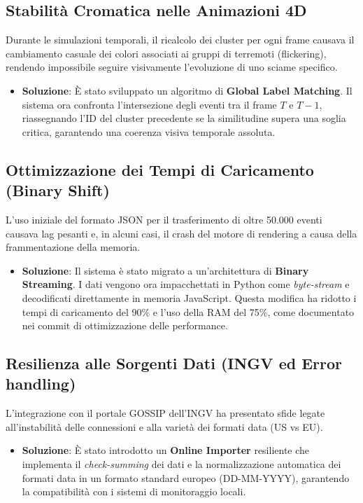 \documentclass[12pt,a4paper]{article}
\begin{document}
\subsection{Stabilità Cromatica nelle Animazioni 4D}
Durante le simulazioni temporali, il ricalcolo dei cluster per ogni frame causava il cambiamento casuale dei colori associati ai gruppi di terremoti (flickering), rendendo impossibile seguire visivamente l'evoluzione di uno sciame specifico.
\begin{itemize}
    \item \textbf{Soluzione}: È stato sviluppato un algoritmo di \textbf{Global Label Matching}. Il sistema ora confronta l'intersezione degli eventi tra il frame $T$ e $T-1$, riassegnando l'ID del cluster precedente se la similitudine supera una soglia critica, garantendo una coerenza visiva temporale assoluta.
\end{itemize}

\subsection{Ottimizzazione dei Tempi di Caricamento (Binary Shift)}
L'uso iniziale del formato JSON per il trasferimento di oltre 50.000 eventi causava lag pesanti e, in alcuni casi, il crash del motore di rendering a causa della frammentazione della memoria.
\begin{itemize}
    \item \textbf{Soluzione}: Il sistema è stato migrato a un'architettura di \textbf{Binary Streaming}. I dati vengono ora impacchettati in Python come \textit{byte-stream} e decodificati direttamente in memoria JavaScript. Questa modifica ha ridotto i tempi di caricamento del 90\% e l'uso della RAM del 75\%, come documentato nei commit di ottimizzazione delle performance.
\end{itemize}

\subsection{Resilienza alle Sorgenti Dati (INGV ed Error handling)}
L'integrazione con il portale GOSSIP dell'INGV ha presentato sfide legate all'instabilità delle connessioni e alla varietà dei formati data (US vs EU).
\begin{itemize}
    \item \textbf{Soluzione}: È stato introdotto un \textbf{Online Importer} resiliente che implementa il \textit{check-summing} dei dati e la normalizzazione automatica dei formati data in un formato standard europeo (DD-MM-YYYY), garantendo la compatibilità con i sistemi di monitoraggio locali.
\end{itemize}
\end{document}
